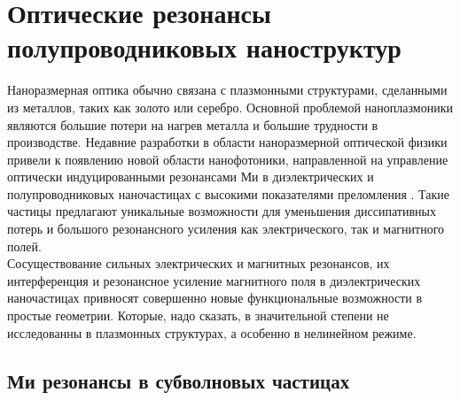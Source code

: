 \section{Оптические резонансы полупроводниковых наноструктур}
\hspace*{2mm}
Наноразмерная оптика обычно связана с плазмонными структурами, сделанными из металлов, таких как золото или серебро. Основной проблемой наноплазмоники являются большие потери на нагрев металла и большие трудности в производстве. Недавние разработки в области наноразмерной оптической физики привели к появлению новой области нанофотоники, направленной на управление оптически индуцированными резонансами Ми в диэлектрических и полупроводниковых наночастицах с высокими показателями преломления \cite{kuznetsov2016optically}. Такие частицы предлагают уникальные возможности для уменьшения диссипативных потерь и большого резонансного усиления как электрического, так и магнитного полей. 
\\
\hspace*{2mm}
Сосуществование сильных электрических и магнитных резонансов, их интерференция и резонансное усиление магнитного поля в диэлектрических наночастицах привносят совершенно новые функциональные возможности в простые геометрии. Которые, надо сказать, в значительной степени не исследованны в плазмонных структурах, а особенно в нелинейном режиме.

\subsection*{Ми резонансы в субволновых частицах}

